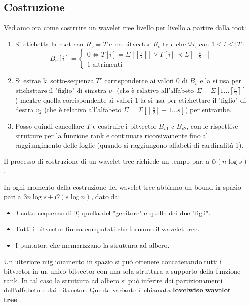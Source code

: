 \subsection{Costruzione}
Vediamo ora come costruire un wavelet tree livello per livello a partire dalla
root:
\begin{enumerate}
    \item Si etichetta la root con $R_v = T$ e un bitvector $B_v$ tale che
          $\forall i$, con $1 \leq i \leq |T|$:
          \begin{equation}
              B_v[i] = \begin{cases}
                  0 \iff T[i] = \Sigma\left[\left\lceil \frac{s}{2}
                      \right\rceil\right] \lor T[i] \prec \Sigma\left[
                  \left\lceil \frac{s}{2} \right\rceil\right] \\
                  1 \text{ altrimenti}
              \end{cases}
          \end{equation}
    \item Si estrae la sotto-sequenza $T'$ corrispondente ai valori 0 di $B_v$ e
          la si usa per etichettare il "figlio" di sinistra $v_1$ (che è relativo
          all'alfabeto $\Sigma = \Sigma\left[1 \dots \left\lceil \frac{s}{2}
                  \right\rceil\right]$) mentre quella corrispondente ai valori 1
          la si usa per etichettare il "figlio" di destra $v_2$ (che è relativo
          all'alfabeto $\Sigma = \Sigma\left[\left\lceil \frac{s}{2} \right\rceil
                  + 1 \dots s \right]$) per entrambe.
    \item Posso quindi cancellare $T$ e costruire i bitvector $B_{v1}$ e $B_{v2}$,
          con le rispettive strutture per la funzione rank e continuare
          ricorsivamente fino al raggiungimento delle foglie (quando si
          raggiungono alfabeti di cardinalità 1).
\end{enumerate}
Il processo di costruzione di un wavelet tree richiede un tempo pari a
$\mathcal{O}(n \log s)$.

In ogni momento della costruzione del wavelet tree abbiamo un bound in spazio
pari a $3n \log s + \mathcal{O}(s \log n)$, dato da:
\begin{itemize}
    \item 3 sotto-sequenze di $T$, quella del "genitore" e quelle dei due "figli".
    \item Tutti i bitvector finora computati che formano il wavelet tree.
    \item I puntatori che memorizzano la struttura ad albero.
\end{itemize}
Un ulteriore miglioramento in spazio si può ottenere concatenando tutti i bitvector
in un unico bitvector con una sola struttura a supporto della funzione rank. In
tal caso la struttura ad albero si può inferire dai partizionamenti dell'alfabeto
e dai bitvector. Questa variante è chiamata \textbf{levelwise wavelet tree}.

